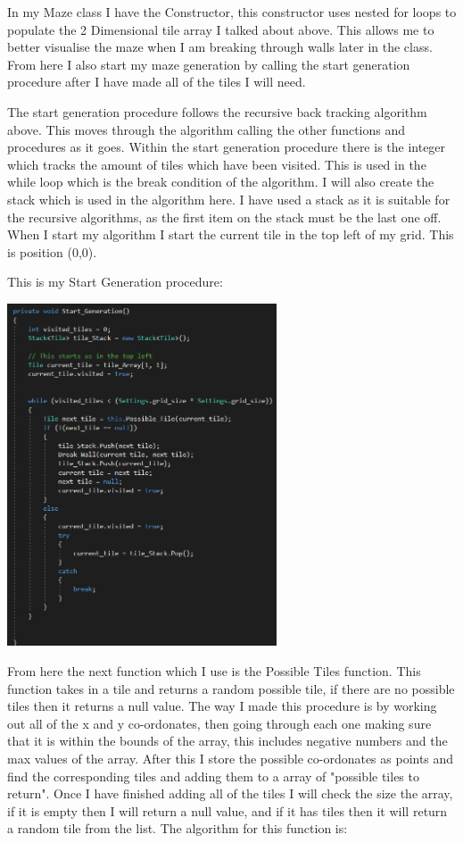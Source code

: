 \documentclass[12pt]{article}
\begin{document}
In my Maze class I have the Constructor, this constructor uses nested for loops to populate the 2 Dimensional tile array I talked about above. This allows me to better visualise the maze when I am breaking through walls later in the class. From here I also start my maze generation by calling the start generation procedure after I have made all of the tiles I will need. 

The start generation procedure follows the recursive back tracking algorithm above. This moves through the algorithm calling the other functions and procedures as it goes. Within the start generation procedure there is the integer which tracks the amount of tiles which have been visited. This is used in the while loop which is the break condition of the algorithm. I will also create the stack which is used in the algorithm here. I have used a stack as it is suitable for the recursive algorithms, as the first item on the stack must be the last one off. When I start my algorithm I start the current tile in the top left of my grid. This is position (0,0). 


This is my Start Generation procedure:

\includegraphics[width = 0.6\textwidth]{Maze_start_generation_procedure}

From here the next function which I use is the Possible Tiles function. This function takes in a tile and returns a random possible tile, if there are no possible tiles then it returns a null value. The way I made this procedure is by working out all of the x and y co-ordonates, then going through each one making sure that it is within the bounds of the array, this includes negative numbers and the max values of the array. After this I store the possible co-ordonates as points and find the corresponding tiles and adding them to a array of "possible tiles to return". Once I have finished adding all of the tiles I will check the size the array, if it is empty then I will return a null value, and if it has tiles then it will return a random tile from the list. The algorithm for this function is:
\end{document}
